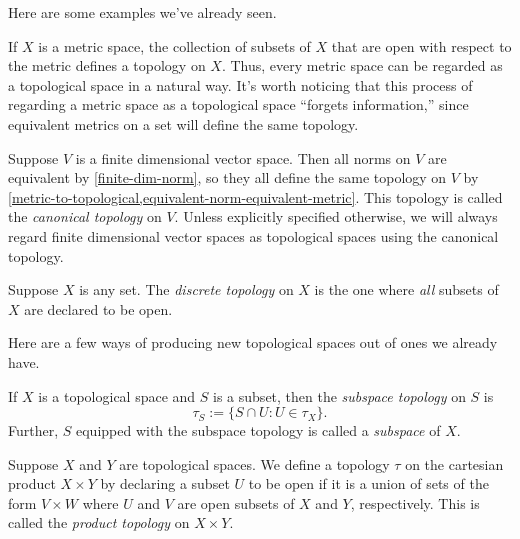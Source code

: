 Here are some examples we've already seen. 

\begin{example} \label{metric-to-topological}
	If $X$ is a metric space, the collection of subsets of $X$ that are open with respect to the metric defines a topology on $X$. Thus, every metric space can be regarded as a topological space in a natural way. It's worth noticing that this process of regarding a metric space as a topological space ``forgets information,'' since equivalent metrics on a set will define the same topology. 
\end{example}

\begin{example} \label{finite-dim-canonical-topology} 
	Suppose $V$ is a finite dimensional vector space. Then all norms on $V$ are equivalent by \cref{finite-dim-norm}, so they all define the same topology on $V$ by \cref{metric-to-topological,equivalent-norm-equivalent-metric}. This topology is called the \emph{canonical topology} on $V$. Unless explicitly specified otherwise, we will always regard finite dimensional vector spaces as topological spaces using the canonical topology. 
\end{example}

\begin{example} \label{discrete-topology}
	Suppose $X$ is any set. The \emph{discrete topology} on $X$ is the one where \emph{all} subsets of $X$ are declared to be open. 
\end{example}

Here are a few ways of producing new topological spaces out of ones we already have. 

\begin{example}[Subspace] \label{subspace-topology}  
	If $X$ is a topological space and $S$ is a subset, then the \emph{subspace topology} on $S$ is
	\[ \tau_S := \{ S \cap U : U \in \tau_X \}. \]
	Further, $S$ equipped with the subspace topology is called a \emph{subspace} of $X$. 
\end{example}

\begin{example} \label{product-space} 
	Suppose $X$ and $Y$ are topological spaces. We define a topology $\tau$ on the cartesian product $X \times Y$ by declaring a subset $U$ to be open if it is a union of sets of the form $V \times W$ where $U$ and $V$ are open subsets of $X$ and $Y$, respectively. This is called the \emph{product topology} on $X \times Y$. 
\end{example}

